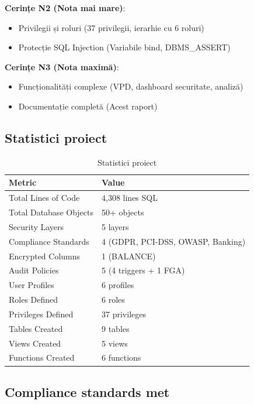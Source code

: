 \documentclass[12pt,a4paper]{article}
\begin{document}
\textbf{Cerințe N2 (Nota mai mare)}:
\begin{itemize}
    \item[$\checkmark$] Privilegii și roluri (37 privilegii, ierarhie cu 6 roluri)
    \item[$\checkmark$] Protecție SQL Injection (Variabile bind, DBMS\_ASSERT)
\end{itemize}

\textbf{Cerințe N3 (Nota maximă)}:
\begin{itemize}
    \item[$\checkmark$] Funcționalități complexe (VPD, dashboard securitate, analiză)
    \item[$\checkmark$] Documentație completă (Acest raport)
\end{itemize}

\subsection{Statistici proiect}

\begin{table}[H]
\centering
\begin{tabular}{ll}
\toprule
\textbf{Metric} & \textbf{Value} \\
\midrule
Total Lines of Code & 4,308 lines SQL \\
Total Database Objects & 50+ objects \\
Security Layers & 5 layers \\
Compliance Standards & 4 (GDPR, PCI-DSS, OWASP, Banking) \\
Encrypted Columns & 1 (BALANCE) \\
Audit Policies & 5 (4 triggers + 1 FGA) \\
User Profiles & 6 profiles \\
Roles Defined & 6 roles \\
Privileges Defined & 37 privileges \\
Tables Created & 9 tables \\
Views Created & 5 views \\
Functions Created & 6 functions \\
\bottomrule
\end{tabular}
\caption{Statistici proiect}
\label{tab:stats}
\end{table}

\subsection{Compliance standards met}
\end{document}
